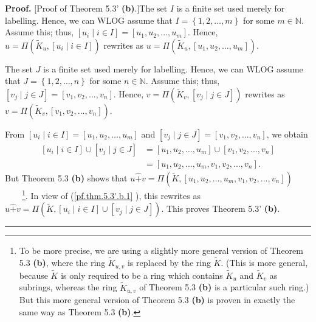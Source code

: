 \documentclass[numbers=enddot,12pt,final,onecolumn,notitlepage]{scrartcl}%
\newenvironment{proof}[1][Proof]{\noindent\textbf{#1.} }{\ \rule{0.5em}{0.5em}}
\begin{document}
\begin{proof}
[Proof of Theorem 5.3' \textbf{(b)}.]The set $I$ is a finite set used merely
for labelling. Hence, we can WLOG assume that $I=\left\{  1,2,\ldots
,m\right\}  $ for some $m\in\mathbb{N}$. Assume this; thus, $\left[  u_{i}\mid
i\in I\right]  =\left[  u_{1},u_{2},\ldots,u_{m}\right]  $. Hence,
$u=\Pi\left(  \widetilde{K}_{u},\left[  u_{i}\mid i\in I\right]  \right)  $
rewrites as \newline$u=\Pi\left(  \widetilde{K}_{u},\left[  u_{1},u_{2}%
,\ldots,u_{m}\right]  \right)  $.

The set $J$ is a finite set used merely for labelling. Hence, we can WLOG
assume that $J=\left\{  1,2,\ldots,n\right\}  $ for some $n\in\mathbb{N}$.
Assume this; thus, $\left[  v_{j}\mid j\in J\right]  =\left[  v_{1}%
,v_{2},...,v_{n}\right]  $. Hence, $v=\Pi\left(  \widetilde{K}_{v},\left[
v_{j}\mid j\in J\right]  \right)  $ rewrites as $v=\Pi\left(  \widetilde{K}%
_{v},\left[  v_{1},v_{2},...,v_{n}\right]  \right)  $.

From $\left[  u_{i}\mid i\in I\right]  =\left[  u_{1},u_{2},\ldots
,u_{m}\right]  $ and $\left[  v_{j}\mid j\in J\right]  =\left[  v_{1}%
,v_{2},...,v_{n}\right]  $, we obtain%
\begin{align}
\left[  u_{i}\mid i\in I\right]  \cup\left[  v_{j}\mid j\in J\right]   &
=\left[  u_{1},u_{2},\ldots,u_{m}\right]  \cup\left[  v_{1},v_{2}%
,...,v_{n}\right] \nonumber\\
&  =\left[  u_{1},u_{2},...,u_{m},v_{1},v_{2},...,v_{n}\right]  .
\label{pf.thm.5.3'.b.1}%
\end{align}
But Theorem 5.3 \textbf{(b)} shows that $u\widehat{+}v=\Pi\left(
\widetilde{K},\left[  u_{1},u_{2},...,u_{m},v_{1},v_{2},...,v_{n}\right]
\right)  $\ \ \ \ \footnote{To be more precise, we are using a slightly more
general version of Theorem 5.3 \textbf{(b)}, where the ring $\widetilde{K}%
_{u,v}$ is replaced by the ring $\widetilde{K}$. (This is more general,
because $\widetilde{K}$ is only required to be a ring which contains
$\widetilde{K}_{u}$ and $\widetilde{K}_{v}$ as subrings, whereas the ring
$\widetilde{K}_{u,v}$ of Theorem 5.3 \textbf{(b)} is a particular such ring.)
But this more general version of Theorem 5.3 \textbf{(b)} is proven in exactly
the same way as Theorem 5.3 \textbf{(b)}.}. In view of (\ref{pf.thm.5.3'.b.1}%
), this rewrites as $u\widehat{+}v=\Pi\left(  \widetilde{K},\left[  u_{i}\mid
i\in I\right]  \cup\left[  v_{j}\mid j\in J\right]  \right)  $. This proves
Theorem 5.3' \textbf{(b)}.
\end{proof}
\end{document}
